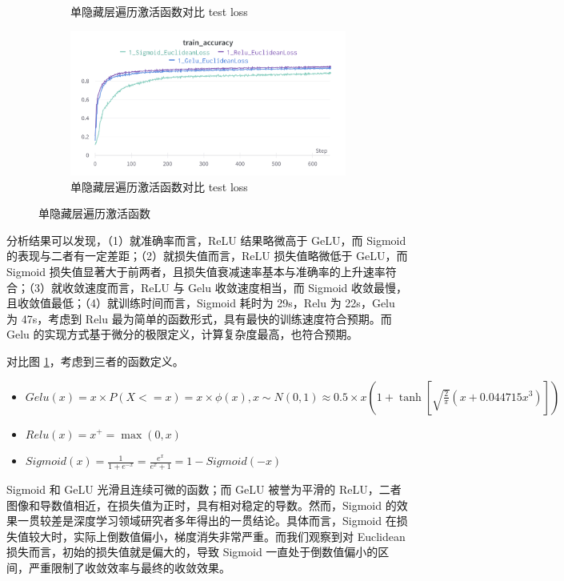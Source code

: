 \documentclass{article}
\begin{document}
\begin{figure}[htbp]
\begin{subfigure}{0.475\textwidth}
		\caption{单隐藏层遍历激活函数对比 test loss}
	\end{subfigure}
	\begin{subfigure}{0.475\textwidth}
		\centering
		\includegraphics[width=1\textwidth]{../pics/单层激活函数train_acc.png}
		\caption{单隐藏层遍历激活函数对比 test loss}
	\end{subfigure}
	\caption{单隐藏层遍历激活函数}
	\label{fig:5}
\end{figure}

分析结果可以发现，（1）就准确率而言，ReLU 结果略微高于 GeLU，而 Sigmoid 的表现与二者有一定差距；（2）就损失值而言，ReLU 损失值略微低于 GeLU，而 Sigmoid 损失值显著大于前两者，且损失值衰减速率基本与准确率的上升速率符合；（3）就收敛速度而言，ReLU 与 Gelu 收敛速度相当，而 Sigmoid 收敛最慢，且收敛值最低；（4）就训练时间而言，Sigmoid 耗时为 29s，Relu 为 22s，Gelu 为 47s，考虑到 Relu 最为简单的函数形式，具有最快的训练速度符合预期。而 Gelu 的实现方式基于微分的极限定义，计算复杂度最高，也符合预期。

对比图 \ref{fig:5}，考虑到三者的函数定义。
\begin{itemize}
    \item $Gelu(x)=x \times P(X<=x)=x \times \phi(x), x \sim N(0,1) \approx  0.5 \times x\left(1+\tanh \left[\sqrt{\frac{2}{\pi}}\left(x+0.044715 x^3\right)\right]\right)$
    \item $Relu(x)=x^{+}=\max (0, x)$
    \item $Sigmoid(x)=\frac{1}{1+e^{-x}}=\frac{e^x}{e^x+1}=1-Sigmoid(-x)$
\end{itemize}

Sigmoid 和 GeLU 光滑且连续可微的函数；而 GeLU 被誉为平滑的 ReLU，二者图像和导数值相近，在损失值为正时，具有相对稳定的导数。然而，Sigmoid 的效果一贯较差是深度学习领域研究者多年得出的一贯结论。具体而言，Sigmoid 在损失值较大时，实际上倒数值偏小，梯度消失非常严重。而我们观察到对 Euclidean 损失而言，初始的损失值就是偏大的，导致 Sigmoid 一直处于倒数值偏小的区间，严重限制了收敛效率与最终的收敛效果。
\end{document}
